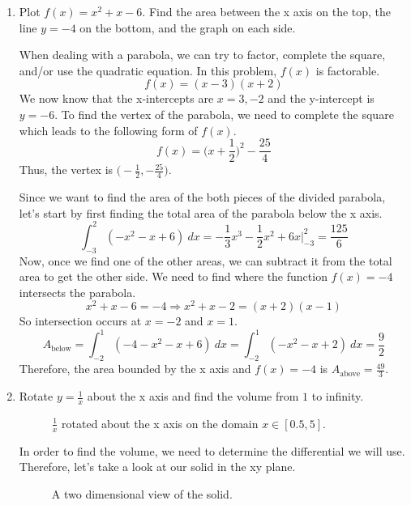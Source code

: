 \begin{enumerate}
\item
  Plot \(f(x) = x^2 + x - 6\).
  Find the area between the x axis on the top, the line \(y = -4\) on the
  bottom, and the graph on each side.
  \par\smallskip
  When dealing with a parabola, we can try to factor, complete the square,
  and/or use the quadratic equation.
  In this problem, \(f(x)\) is factorable.
  \[
  f(x) = (x - 3)(x + 2)
  \]
  We now know that the x-intercepts are \(x = 3, -2\) and the y-intercept is
  \(y = -6\).
  To find the vertex of the parabola, we need to complete the square which leads
  to the following form of \(f(x)\).
  \[
  f(x) = \Big(x + \frac{1}{2}\Big)^2 - \frac{25}{4}
  \]
  Thus, the vertex is \(\big(-\frac{1}{2}, -\frac{25}{4}\big)\).
  \begin{figure}[H]
    \centering
    
    \caption{}
  \end{figure}
  Since we want to find the area of the both pieces of the divided parabola,
  let's start by first finding the total area of the parabola below the x
  axis.
  \[
  \int_{-3}^2(-x^2 - x + 6) \ dx =
  -\frac{1}{3}x^3 - \frac{1}{2}x^2 + 6x\Big|_{-3}^2 = \frac{125}{6}
  \]
  Now, once we find one of the other areas, we can subtract it from the total
  area to get the other side.
  We need to find where the function \(f(x) = -4\) intersects the parabola.
  \[
  x^2 + x - 6 = -4\Rightarrow x^2 + x - 2 = (x + 2)(x - 1)
  \]
  So intersection occurs at \(x = -2\) and \(x = 1\).
  \[
  A_{\text{below}} = \int_{-2}^1(-4 - x^2 - x + 6) \ dx =
  \int_{-2}^1(-x^2 - x + 2) \ dx = \frac{9}{2}
  \]
  Therefore, the area bounded by the x axis and \(f(x) = -4\) is
  \(A_{\text{above}} = \frac{49}{3}\).
\item
  Rotate \(y = \frac{1}{x}\) about the x axis and find the volume from \(1\)
  to infinity.
  \begin{figure}[H]
    \centering
    
    \caption{\(\frac{1}{x}\) rotated about the x axis on the domain
      \(x\in[0.5, 5]\).}
  \end{figure}
  In order to find the volume, we need to determine the differential we will
  use.
  Therefore, let's take a look at our solid in the xy plane.
  \begin{figure}[H]
    \centering
    
    \caption{A two dimensional view of the solid.}
  \end{figure}

\end{enumerate}

